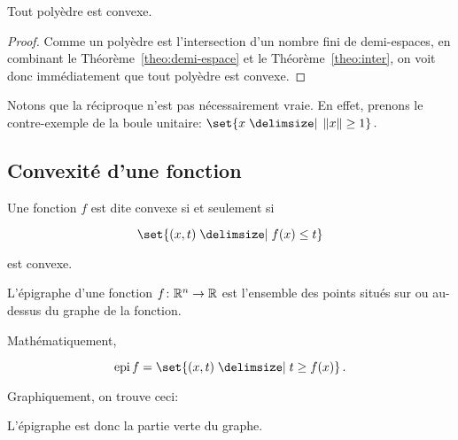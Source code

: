 	\begin{mytheo}\leavevmode
		Tout polyèdre est convexe.
		\begin{proof}
			Comme un polyèdre est l'intersection
			d'un nombre fini de demi-espaces,
			en combinant le Théorème~\ref{theo:demi-espace}
			et le Théorème~\ref{theo:inter},
			on voit donc immédiatement
			que tout polyèdre est convexe.
		\end{proof}

		\begin{myrem}
			Notons que la réciproque n'est pas nécessairement vraie.
			En effet,
			prenons le contre-exemple de la boule unitaire:
			$\set{x \given \norm{x} \ge 1}\,.$
		\end{myrem}
	\end{mytheo}

\subsection{Convexité d'une fonction}

	\begin{mydef}\leavevmode
		Une fonction $f$ est dite convexe si et seulement si

		\[
		\set{(x,t) \given f(x) \le t}
		\]

		est convexe.
	\end{mydef}

	\begin{mydef}\leavevmode
		L'épigraphe d'une fonction $f \colon \mathbb{R}^n \to \mathbb{R}$
		est l'ensemble des points situés sur ou au-dessus
		du graphe de la fonction.

		Mathématiquement,

		\[
		\epi f = \set{(x,t) \given t \ge f(x)}\,.
		\]

		Graphiquement, on trouve ceci:

		\begin{center}
		\end{center}

		L'épigraphe est donc la partie verte du graphe.
	\end{mydef}

